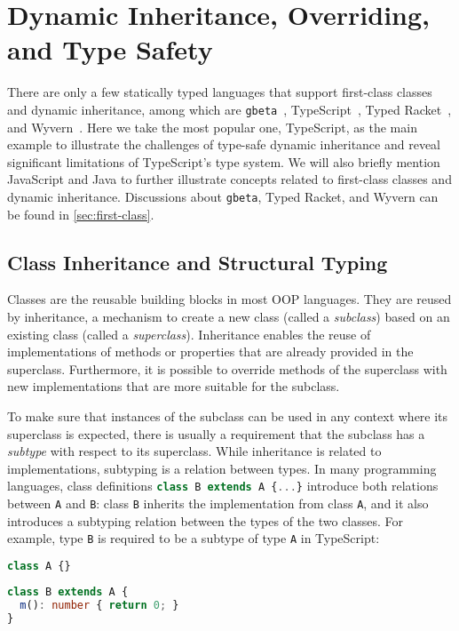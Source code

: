 \section{Dynamic Inheritance, Overriding, and Type Safety} \label{sec:background}

There are only a few statically typed languages that support first-class classes
and dynamic inheritance, among which are \texttt{gbeta}~\citep{ernst2000gbeta},
TypeScript~\citep{typescript}, Typed Racket~\citep{takikawa2012gradual}, and
Wyvern~\citep{lee2015theory}. Here we take the most popular one, TypeScript, as
the main example to illustrate the challenges of type-safe dynamic inheritance
and reveal significant limitations of TypeScript's type system. We will also
briefly mention JavaScript and Java to further illustrate concepts related to
first-class classes and dynamic inheritance. Discussions about \texttt{gbeta},
Typed Racket, and Wyvern can be found in \autoref{sec:first-class}.

\subsection{Class Inheritance and Structural Typing} \label{sec:bivariant}
Classes are the reusable building blocks in most OOP languages. They are reused
by inheritance, a mechanism to create a new class (called a \emph{subclass})
based on an existing class (called a \emph{superclass}). Inheritance enables the
reuse of implementations of methods or properties that are already provided in
the superclass. Furthermore, it is possible to override methods of the
superclass with new implementations that are more suitable for the subclass.

To make sure that instances of the subclass can be used in any context where its
superclass is expected, there is usually a requirement that the subclass has a
\emph{subtype} with respect to its superclass. While inheritance is related to
implementations, subtyping is a relation between types. In many programming
languages, class definitions
\lstinline[language=TypeScript]|class B extends A {...}| introduce both
relations between \lstinline{A} and \lstinline{B}: class \lstinline{B} inherits
the implementation from class \lstinline{A}, and it also introduces a subtyping
relation between the types of the two classes. For example, type \lstinline{B}
is required to be a subtype of type \lstinline{A} in TypeScript:

\noindent
\begin{minipage}{.5\textwidth}
\begin{lstlisting}[language=TypeScript]
class A {}
\end{lstlisting}
\end{minipage}%
\begin{minipage}{.5\textwidth}
\begin{lstlisting}[language=TypeScript]
class B extends A {
  m(): number { return 0; }
}
\end{lstlisting}
\end{minipage}


